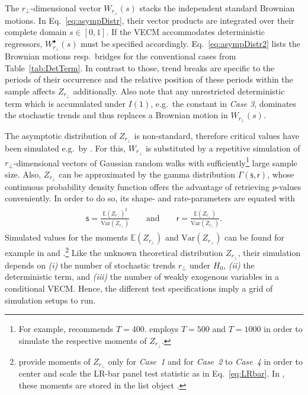 The $ r_\perp $-dimensional vector $ W_{r_\perp} {\left( s \right)} $ stacks the independent standard Brownian motions. In Eq.~\eqref{eq:asympDistr}, their vector products are integrated over their complete domain $ s \in [0,1] $. If the VECM accommodates deterministic regressors, $ W^\bullet_{r_\perp} {\left( s \right)} $ must be specified accordingly. Eq.~\eqref{eq:asympDistr2} lists the Brownian motions resp.~bridges for the conventional cases from Table~\ref{tab:DetTerm}. In contrast to those, trend breaks are specific to the periods of their occurrence and the relative position of these periods within the sample affects $ Z_{r_\perp} $ additionally. Also note that any unrestricted deterministic term which is accumulated under $ I(1) $, e.g.~the constant in \textit{Case 3}, dominates the stochastic trends and thus replaces a Brownian motion in $ W_{r_\perp} {\left( s \right)} $.

The asymptotic distribution of $ Z_{r_\perp} $ is non-standard, therefore critical values have been simulated e.g.~by \cite{OsterwaldLenum1992}. For this, $ W_{r_\perp} $ is substituted by a repetitive simulation of $ r_\perp $-dimensional vectors of Gaussian random walks with sufficiently\footnote{For example, \citet[Ch.~15]{Johansen1996} recommends $T=400$. \citet[p.~171, App.~B]{Breitung2005} employs $ T=500$ and \citet{OersalDroge2014} $ T=1000 $ in order to simulate the respective moments of $ Z_{r_\perp} $.} large sample size. Also, $ Z_{r_\perp} $ can be approximated by the gamma distribution $ \Gamma (\mathsf{s}, \mathsf{r}) $, whose continuous probability density function offers the advantage of retrieving $p$-values conveniently. In order to do so, its shape- and rate-parameters are equated with
\begin{align} \label{eq:GammaParameter}
\begin{split}
	\mathsf{s} = \frac{\mathbb{E}(Z_{r_\perp})^2}{ \text{Var}(Z_{r_\perp}) } \qquad \text{and} \qquad \mathsf{r} = \frac{\mathbb{E}(Z_{r_\perp})}{ \text{Var}(Z_{r_\perp}) }.
\end{split}
\end{align}
Simulated values for the moments $ \mathbb{E}(Z_{r_\perp}) $ and $ \text{Var}(Z_{r_\perp}) $ can be found for example in \citet{LarssonEtAl2001} and \citet{Breitung2005}.\footnote{\citet{LarssonEtAl2001} provide moments of $ Z_{r_\perp} $ only for \textit{Case~1} and \citet{Breitung2005} for \textit{Case~2} to \textit{Case~4} in order to center and scale the LR-bar panel test statistic as in Eq.~\eqref{eq:LRbar}. In , these moments are stored in the list object .} Like the unknown theoretical distribution $ Z_{r_\perp} $, their simulation depends on \textit{(i)} the number of stochastic trends $ r_\perp $ under $ H_0 $, \textit{(ii)} the deterministic term, and \textit{(iii)} the number of weakly exogenous variables in a conditional VECM. Hence, the different test specifications imply a grid of simulation setups to run.

